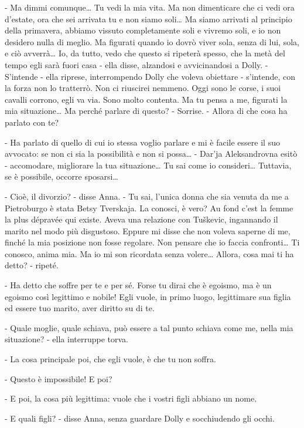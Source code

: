 - Ma dimmi comunque\ldots{} Tu vedi la mia vita. Ma non dimenticare che ci vedi ora d'estate, ora che sei arrivata tu e non siamo soli\ldots{} Ma siamo arrivati al principio della primavera, abbiamo vissuto completamente soli e vivremo soli, e io non desidero nulla di meglio. Ma figurati quando io dovrò viver sola, senza di lui, sola, e ciò avverrà\ldots{} Io, da tutto, vedo che questo si ripeterà spesso, che la metà del tempo egli sarà fuori casa - ella disse, alzandosi e avvicinandosi a Dolly. - S'intende - ella riprese, interrompendo Dolly che voleva obiettare - s'intende, con la forza non lo tratterrò. Non ci riuscirei nemmeno. Oggi sono le corse, i suoi cavalli corrono, egli va via. Sono molto contenta. Ma tu pensa a me, figurati la mia situazione\ldots{} Ma perché parlare di questo? - Sorrise. - Allora di che cosa ha parlato con te? 

- Ha parlato di quello di cui io stessa voglio parlare e mi è facile essere il suo avvocato: se non ci sia la possibilità e non si possa\ldots{} - Dar'ja Aleksandrovna esitò - accomodare, migliorare la tua situazione\ldots{} Tu sai come io consideri\ldots{} Tuttavia, se è possibile, occorre sposarsi\ldots{} 

- Cioè, il divorzio? - disse Anna. - Tu sai, l'unica donna che sia venuta da me a Pietroburgo è stata Betsy Tverskaja. La conosci, è vero? Au fond c'est la femme la plus dépravée qui existe. Aveva una relazione con Tuškevic, ingannando il marito nel modo più disgustoso. Eppure mi disse che non voleva saperne di me, finché la mia posizione non fosse regolare. Non pensare che io faccia confronti\ldots{} Ti conosco, anima mia. Ma io mi son ricordata senza volere\ldots{} Allora, cosa mai ti ha detto? - ripeté. 

- Ha detto che soffre per te e per sé. Forse tu dirai che è egoismo, ma è un egoismo così legittimo e nobile! Egli vuole, in primo luogo, legittimare sua figlia ed essere tuo marito, aver diritto su di te. 

- Quale moglie, quale schiava, può essere a tal punto schiava come me, nella mia situazione? - ella interruppe torva. 

- La cosa principale poi, che egli vuole, è che tu non soffra. 

- Questo è impossibile! E poi? 

- E poi, la cosa più legittima: vuole che i vostri figli abbiano un nome. 

- E quali figli? - disse Anna, senza guardare Dolly e socchiudendo gli occhi. 

